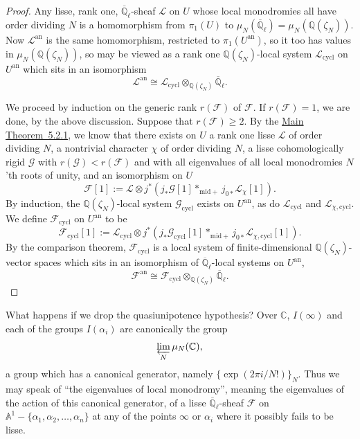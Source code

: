 \begin{proof}
Any lisse, rank one, \(\overline{\mathbb{Q}}_\ell\)-sheaf \(\mathcal{L}\) on
\(U\) whose local monodromies all have order dividing \(N\) is a homomorphism
from \(\pi_1(U)\) to
\(\mu_N(\overline{\mathbb{Q}}_\ell)=\mu_N(\mathbb{Q}(\zeta_N))\). Now
\(\mathcal{L}^{\mathrm{an}}\) is the same homomorphism, restricted to
\(\pi_1(U^{\mathrm{an}})\), so it too has values in
\(\mu_N(\mathbb{Q}(\zeta_N))\), so may be viewed as a rank one
\(\mathbb{Q}(\zeta_N)\)-local system \(\mathcal{L}_{\mathrm{cycl}}\) on
\(U^{\mathrm{an}}\) which sits in an isomorphism
\[
  \mathcal{L}^{\mathrm{an}}\cong
  \mathcal{L}_{\mathrm{cycl}}\otimes_{\mathbb{Q}(\zeta_N)}
  \overline{\mathbb{Q}}_\ell.
\]

We proceed by induction on the generic rank \(r(\mathcal{F})\) of
\(\mathcal{F}\). If \(r(\mathcal{F})=1\), we are done, by the above
discussion. Suppose that \(r(\mathcal{F})\geq 2\). By the
\hyperref[thm:5.2.1]{Main Theorem~5.2.1}, we know that there exists on \(U\) a rank
one lisse \(\mathcal{L}\) of order dividing \(N\), a nontrivial character
\(\chi\) of order dividing \(N\), a lisse cohomologically rigid \(\mathcal{G}\)
with \(r(\mathcal{G})<r(\mathcal{F})\) and with all eigenvalues of all local
monodromies \(N\)'th roots of unity, and an isomorphism on \(U\)
\[
  \mathcal{F}[1]:=
  \mathcal{L}\otimes j^*(j_*\mathcal{G}[1]*_{\mathrm{mid}+}
  j_{0*}\mathcal{L}_\chi[1]).
\]
By induction, the \(\mathbb{Q}(\zeta_N)\)-local system
\(\mathcal{G}_{\mathrm{cycl}}\) exists on \(U^{\mathrm{an}}\), as do
\(\mathcal{L}_{\mathrm{cycl}}\) and \(\mathcal{L}_{\chi,\mathrm{cycl}}\). We
define \(\mathcal{F}_{\mathrm{cycl}}\) on \(U^{\mathrm{an}}\) to be
\[
  \mathcal{F}_{\mathrm{cycl}}[1]:=
  \mathcal{L}_{\mathrm{cycl}}\otimes
  j^*(j_*\mathcal{G}_{\mathrm{cycl}}[1]*_{\mathrm{mid}+}
  j_{0*}\mathcal{L}_{\chi,\mathrm{cycl}}[1]).
\]
By the comparison theorem, \(\mathcal{F}_{\mathrm{cycl}}\) is a local system
of finite-dimensional \(\mathbb{Q}(\zeta_N)\)-vector spaces which sits in an
isomorphism of \(\overline{\mathbb{Q}}_\ell\)-local systems on
\(U^{\mathrm{an}}\),
\[
  \mathcal{F}^{\mathrm{an}}\cong
  \mathcal{F}_{\mathrm{cycl}}\otimes_{\mathbb{Q}(\zeta_N)}
  \overline{\mathbb{Q}}_\ell.
\]
\end{proof}

What happens if we drop the quasiunipotence hypothesis? Over \(\mathbb{C}\),
\(I(\infty)\) and each of the groups \(I(\alpha_i)\) are canonically the group
\[
  \varprojlim_N\mu_N(\mathbb{C}),
\]
a group which has a canonical generator, namely
\(\{\exp(2\pi i/N!)\}_N\). Thus we may speak of ``the eigenvalues of local
monodromy'', meaning the eigenvalues of the action of this canonical generator,
of a lisse \(\overline{\mathbb{Q}}_\ell\)-sheaf \(\mathcal{F}\) on
\(\mathbb{A}^1-\{\alpha_1,\alpha_2,\ldots,\alpha_n\}\) at any of the points
\(\infty\) or \(\alpha_i\) where it possibly fails to be lisse.

